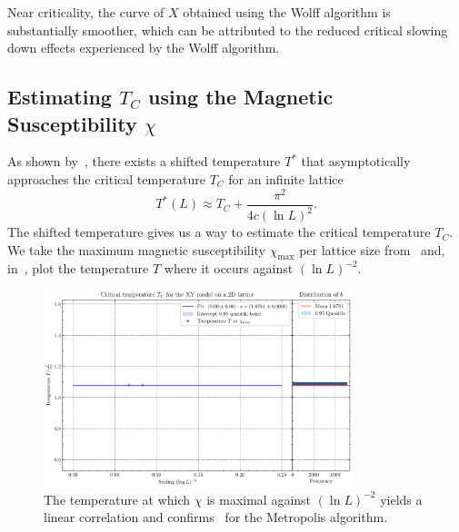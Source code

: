 		Near criticality, the curve of $X$ obtained using the Wolff algorithm is substantially smoother, which can be attributed to the reduced critical slowing down effects experienced by the Wolff algorithm.
	
	\subsection{Estimating \texorpdfstring{$T_C$}{T} using the Magnetic Susceptibility \texorpdfstring{$\chi$}{X}}\label{sec:res:temperature}
		As shown by~\citet[eq. 3]{shifted}, there exists a shifted temperature $T^*$ that asymptotically approaches the critical temperature $T_C$ for an infinite lattice
		\begin{equation}\label{eq:shifted_temperature}
			T^*(L) \approx T_C + \frac{\pi^2}{4c (\ln{L})^2}.
		\end{equation}
		The shifted temperature gives us a way to estimate the critical temperature $T_C$. We take the maximum magnetic susceptibility $\chi_\text{max}$ per lattice size from~ and, in~, plot the temperature $T$ where it occurs against $(\ln{L})^{-2}$.
		\begin{figure}[htbp]
			\centering
			\includegraphics[width=0.8\textwidth]{../figures/Metropolis/Critical_Temperature.pdf}
			\caption[Estimating $T_C$ using the Metropolis algorithm by plotting $T$ where $\chi$ is maximal against $(\ln L)^{-2}$]{The temperature at which $\chi$ is maximal against $(\ln L)^{-2}$ yields a linear correlation and confirms~ for the Metropolis algorithm.}
			\label{fig:critical_temperature}
		\end{figure}
